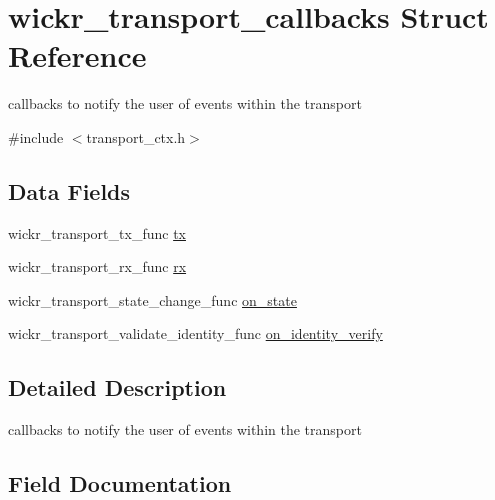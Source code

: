 \hypertarget{structwickr__transport__callbacks}{}\section{wickr\+\_\+transport\+\_\+callbacks Struct Reference}
\label{structwickr__transport__callbacks}


callbacks to notify the user of events within the transport  




{\ttfamily \#include $<$transport\+\_\+ctx.\+h$>$}

\subsection*{Data Fields}
\begin{DoxyCompactItemize}
\item 
wickr\+\_\+transport\+\_\+tx\+\_\+func \hyperlink{structwickr__transport__callbacks_a06c4b21b847c00e92373cf1402e1cb9d}{tx}
\item 
wickr\+\_\+transport\+\_\+rx\+\_\+func \hyperlink{structwickr__transport__callbacks_a5d523402980ac09fdf52aa4824f8e9f7}{rx}
\item 
wickr\+\_\+transport\+\_\+state\+\_\+change\+\_\+func \hyperlink{structwickr__transport__callbacks_afef0716506b88885c57fda652500b3da}{on\+\_\+state}
\item 
wickr\+\_\+transport\+\_\+validate\+\_\+identity\+\_\+func \hyperlink{structwickr__transport__callbacks_ab1afc16797b1bb30dde87936a97f682e}{on\+\_\+identity\+\_\+verify}
\end{DoxyCompactItemize}


\subsection{Detailed Description}
callbacks to notify the user of events within the transport 

\subsection{Field Documentation}
\mbox{\label{structwickr__transport__callbacks_ab1afc16797b1bb30dde87936a97f682e}} 
